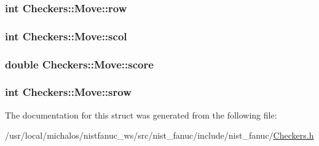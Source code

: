 \hypertarget{structCheckers_1_1Move_a2f318313b9288decf1144fcc8da4457f}{
\subsubsection[{row}]{\setlength{\rightskip}{0pt plus 5cm}int Checkers\-::\-Move\-::row}}\label{structCheckers_1_1Move_a2f318313b9288decf1144fcc8da4457f}
\hypertarget{structCheckers_1_1Move_a8bb137b74b8fef49def2fed2ad19d7ef}{
\subsubsection[{scol}]{\setlength{\rightskip}{0pt plus 5cm}int Checkers\-::\-Move\-::scol}}\label{structCheckers_1_1Move_a8bb137b74b8fef49def2fed2ad19d7ef}
\hypertarget{structCheckers_1_1Move_a2fbd62e73c5906404f0153a17385a25f}{
\subsubsection[{score}]{\setlength{\rightskip}{0pt plus 5cm}double Checkers\-::\-Move\-::score}}\label{structCheckers_1_1Move_a2fbd62e73c5906404f0153a17385a25f}
\hypertarget{structCheckers_1_1Move_a3cf599693d1ee27b69d49fb60b55db0a}{
\subsubsection[{srow}]{\setlength{\rightskip}{0pt plus 5cm}int Checkers\-::\-Move\-::srow}}\label{structCheckers_1_1Move_a3cf599693d1ee27b69d49fb60b55db0a}


The documentation for this struct was generated from the following file\-:\begin{DoxyCompactItemize}
\item 
/usr/local/michalos/nistfanuc\-\_\-ws/src/nist\-\_\-fanuc/include/nist\-\_\-fanuc/\hyperlink{Checkers_8h}{Checkers.\-h}\end{DoxyCompactItemize}
